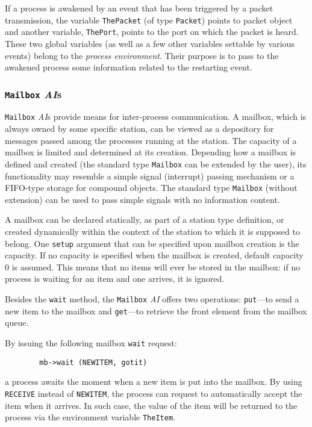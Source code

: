 If a process is awakened by an event that has been triggered by a packet
transmission, the variable {\tt ThePacket} (of type {\tt Packet}) points to
packet object and another variable, {\tt ThePort}, points to the
port on which the packet is heard.
These two global variables (as well as a few other variables settable by
various events) belong to the {\em process environment}.
Their purpose is to pass to the awakened process some information related to
the restarting event.

\subsubsection{{\tt Mailbox} {\em AI\/}s}

{\tt Mailbox} {\em AI\/}s provide means for inter-process communication.
A mailbox, which is always owned by some specific station, can be viewed as
a depository for messages passed among the processes running at the station.
The capacity of a mailbox is limited and
determined at its creation.
Depending how a mailbox is defined and created
(the standard type {\tt Mailbox} can be extended by the user), its functionality
may resemble a simple signal (interrupt) passing mechanism or a FIFO-type
storage for compound objects.
The standard type {\tt Mailbox} (without extension)
can be used to pass simple signals with no information content.

A mailbox can be declared statically, as part of a station type definition,
or created dynamically within the context of the station to which it is
supposed to belong.
One {\tt setup} argument that can be specified upon mailbox creation is
the capacity.
If no capacity is specified when the mailbox is created, default capacity
$0$ is assumed.
This means that no items will ever be
stored in the mailbox: if no process is waiting for an item and one arrives,
it is ignored.

Besides the {\tt wait} method, the {\tt Mailbox} {\em AI\/} offers two
operations: {\tt put}---to send a new item to the mailbox and {\tt get}---to
retrieve the front element from the mailbox queue.

By issuing the following mailbox {\tt wait} request:
\begin{verbatim}
        mb->wait (NEWITEM, gotit)
\end{verbatim}
a process awaits the moment when a new item is put into the mailbox.
By using {\tt RECEIVE} instead of {\tt NEWITEM}, the process can request to
automatically accept the item when it arrives.
In such case, the value of the item will be returned to the process via
the environment variable {\tt TheItem}.

